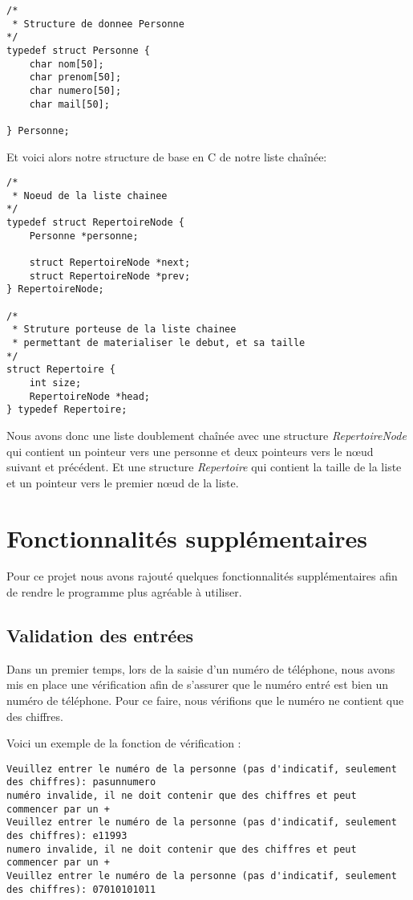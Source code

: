\documentclass[12pt]{report}
\begin{document}
\begin{verbatim}
/*
 * Structure de donnee Personne
*/
typedef struct Personne {
    char nom[50];
    char prenom[50];
    char numero[50];
    char mail[50];

} Personne;
\end{verbatim}


Et voici alors notre structure de base en C de notre liste chaînée:
\begin{verbatim}
/*
 * Noeud de la liste chainee
*/
typedef struct RepertoireNode {
    Personne *personne;

    struct RepertoireNode *next;
    struct RepertoireNode *prev;
} RepertoireNode;

/*
 * Struture porteuse de la liste chainee
 * permettant de materialiser le debut, et sa taille
*/
struct Repertoire {
    int size;
    RepertoireNode *head;
} typedef Repertoire;
\end{verbatim}

Nous avons donc une liste doublement chaînée avec une structure \textit{RepertoireNode} qui contient un pointeur vers une personne et deux pointeurs vers le nœud suivant et précédent. Et une structure \textit{Repertoire} qui contient la taille de la liste et un pointeur vers le premier nœud de la liste.

\chapter{Fonctionnalités supplémentaires}
Pour ce projet nous avons rajouté quelques fonctionnalités supplémentaires afin de rendre le programme plus agréable à utiliser.
\section{Validation des entrées}
Dans un premier temps, lors de la saisie d’un numéro de téléphone, nous avons mis en place une vérification afin de s’assurer que le numéro entré est bien un numéro de téléphone. Pour ce faire, nous vérifions que le numéro ne contient que des chiffres.

Voici un exemple de la fonction de vérification :
\begin{verbatim}
Veuillez entrer le numéro de la personne (pas d'indicatif, seulement des chiffres): pasunnumero
numéro invalide, il ne doit contenir que des chiffres et peut commencer par un +
Veuillez entrer le numéro de la personne (pas d'indicatif, seulement des chiffres): e11993
numero invalide, il ne doit contenir que des chiffres et peut commencer par un +
Veuillez entrer le numéro de la personne (pas d'indicatif, seulement des chiffres): 07010101011
\end{verbatim}
\end{document}
